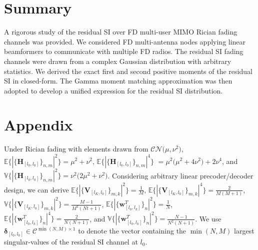 \documentclass[onecolumn]{IEEEtran}
\begin{document}
\section{Summary}

A rigorous study of the residual SI over FD multi-user MIMO Rician fading channels was provided. We considered FD multi-antenna nodes applying linear beamformers to communicate with multiple FD radios. The residual SI fading channels were drawn from a complex Gaussian distribution with arbitrary statistics. We derived the exact first and second positive moments of the residual SI in closed-form. The Gamma moment matching approximation was then adopted to develop a unified expression for the residual SI distribution. 

\appendices




\section*{Appendix}
\label{app:SI-MIMO}

Under Rician fading with elements drawn from $\mathcal{C} \mathcal{N} \big( \mu,\nu^{2} \big)$, $\mathbb{E} \big\{ | \{ \boldsymbol{H}_{[l_{0},l_{0}]} \}_{n,m} |^{2} \big\} = \mu ^2+\nu ^2$, $\mathbb{E} \big\{ | \{ \boldsymbol{H}_{[l_{0},l_{0}]} \}_{n,m} |^4 \big\}$ $= \mu^{2} \big( \mu^2 + 4 \nu^2 \big) + 2 \nu^4$, and $\mathbb{V} \{ | \{ \boldsymbol{H}_{[l_{0},l_{0}]} \}_{n,m} |^{2} \} = \nu^{2} \big( 2 \mu^2 + \nu^2 \big)$. Considering arbitrary linear precoder/decoder design, we can derive $\mathbb{E} \big\{ | \{ \boldsymbol{V}_{[l_{K},l_{0}]}  \}_{m,k} |^{2} \big\} = \tfrac{1}{M}$, $\mathbb{E} \big\{ | \{ \boldsymbol{V}_{[l_{K},l_{0}]}  \}_{m,k} |^4 \big\} = \tfrac{2}{M ( M + 1 )}$, $\mathbb{V} \big\{ | \{ \boldsymbol{V}_{[l_{K},l_{0}]}  \}_{m,k} |^{2} \big\} = \tfrac{M - 1}{M^{2} (Nt + 1)}$, $\mathbb{E} \big\{ | \{ \boldsymbol{w}^{T}_{[l_{0},l_{k}]} \}_{n} |^{2} \big\} =\tfrac{1}{N}$,\linebreak $\mathbb{E} \big\{ | \{ \boldsymbol{w}^{T}_{[l_{0},l_{k}]} \}_{n} |^4 \big\} = \tfrac{2}{N (N + 1)}$, and $\mathbb{V} \big\{ | \{ \boldsymbol{w}^{T}_{[l_{0},l_{k}]} \}_{n} |^{2} \big\} = \tfrac{N - 1}{N^{2} (N + 1)}$. We use $\boldsymbol{\delta}_{[l_{0},l_{0}]} \in \mathcal{C}^{\min (N,M) \times 1}$ to denote the vector containing the $\min (N,M)$ largest singular-values of the residual SI channel at $l_{0}$. 
\end{document}
